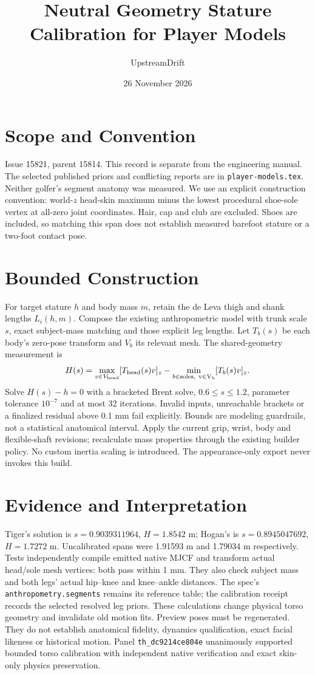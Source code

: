 \documentclass{article}
\title{Neutral Geometry Stature Calibration for Player Models}
\author{UpstreamDrift}
\date{26 November 2026}
\begin{document}
\maketitle
\section{Scope and Convention}
Issue 15821, parent 15814. This record is separate from the engineering
manual. The selected published priors and conflicting reports are in
\texttt{player-models.tex}. Neither golfer's segment anatomy was measured.
We use an explicit construction convention: world-$z$ head-skin maximum
minus the lowest procedural shoe-sole vertex at all-zero joint coordinates.
Hair, cap and club are excluded. Shoes are included, so matching this span
does not establish measured barefoot stature or a two-foot contact pose.
\section{Bounded Construction}
For target stature $h$ and body mass $m$, retain the de Leva thigh and shank
lengths $L_i(h,m)$. Compose the existing anthropometric model with trunk
scale $s$, exact subject-mass matching and those explicit leg lengths.
Let $T_b(s)$ be each body's zero-pose transform and $V_b$ its relevant mesh.
The shared-geometry measurement is
\[
 H(s)=\max_{v\in V_{\rm head}}[T_{\rm head}(s)v]_z
      -\min_{b\in\rm soles,\ v\in V_b}[T_b(s)v]_z.
\]
Solve $H(s)-h=0$ with a bracketed Brent solve, $0.6\leq s\leq1.2$,
parameter tolerance $10^{-7}$ and at most 32 iterations. Invalid inputs,
unreachable brackets or a finalized residual above 0.1 mm fail explicitly.
Bounds are modeling guardrails, not a statistical anatomical interval.
Apply the current grip, wrist, body and flexible-shaft revisions; recalculate
mass properties through the existing builder policy. No custom inertia
scaling is introduced. The appearance-only export never invokes this build.
\section{Evidence and Interpretation}
Tiger's solution is $s=0.9039311964$, $H=1.8542$ m; Hogan's is
$s=0.8945047692$, $H=1.7272$ m. Uncalibrated spans were 1.91593 m and
1.79034 m respectively. Tests independently compile emitted native MJCF
and transform actual head/sole mesh vertices: both pass within 1 mm.
They also check subject mass and both legs' actual hip--knee and knee--ankle
distances. The spec's \texttt{anthropometry.segments} remains its reference
table; the calibration receipt records the selected resolved leg priors.
These calculations change physical torso geometry and invalidate old motion
fits. Preview poses must be regenerated. They do not establish anatomical
fidelity, dynamics qualification, exact facial likeness or historical motion.
Panel \texttt{th\_dc9214ce804e} unanimously supported bounded torso calibration
with independent native verification and exact skin-only physics preservation.
\end{document}
